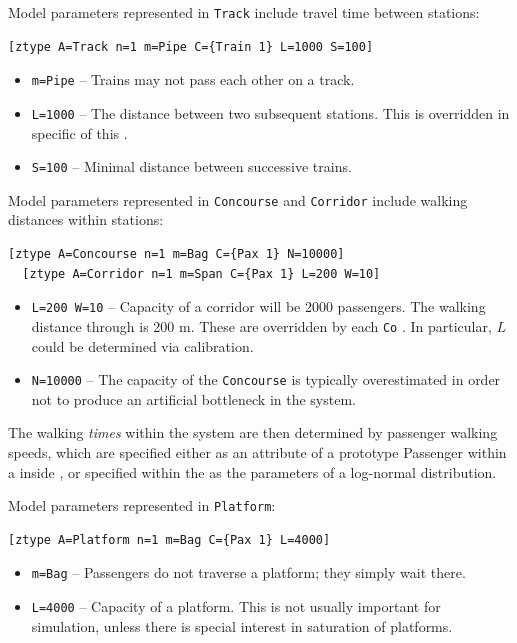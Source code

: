 Model parameters represented in {\tt Track} include travel time between stations:
\begin{lstlisting}[mathescape]
  [ztype A=Track n=1 m=Pipe C={Train 1} L=1000 S=100]
\end{lstlisting}
\begin{itemize}
\item {\tt m=Pipe} -- Trains may not pass each other on a track.
\item {\tt L=1000} -- The distance between two subsequent stations. This is overridden in specific  of this .
\item {\tt S=100} -- Minimal distance between successive trains.
\end{itemize}

Model parameters represented in {\tt Concourse} and {\tt Corridor} include walking distances within stations:
\begin{lstlisting}[mathescape]
  [ztype A=Concourse n=1 m=Bag C={Pax 1} N=10000]
  [ztype A=Corridor n=1 m=Span C={Pax 1} L=200 W=10]
\end{lstlisting}  
\begin{itemize}
\item {\tt L=200 W=10} -- Capacity of a corridor will be 2000 passengers. The walking distance through is 200 m.
  These are overridden by each {\tt Co} . In particular, $L$ could be determined via calibration.
\item {\tt N=10000} -- The capacity of the {\tt Concourse} is typically overestimated in order not to
  produce an artificial bottleneck in the system.
\end{itemize}
The walking \emph{times} within the system are then determined by passenger walking speeds, which
are specified either as an attribute of a prototype Passenger within a  inside
, or specified within the  as the parameters of a log-normal
distribution.

Model parameters represented in {\tt Platform}:
\begin{lstlisting}[mathescape]
  [ztype A=Platform n=1 m=Bag C={Pax 1} L=4000]
\end{lstlisting}
\begin{itemize}
\item {\tt m=Bag} -- Passengers do not traverse a platform; they simply wait there.
\item {\tt L=4000} -- Capacity of a platform. This is not usually important for simulation, unless there is special interest in saturation of platforms.
\end{itemize}

